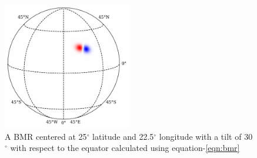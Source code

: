 \begin{figure}
    \centering
    \includegraphics[width=0.5\textwidth]{assets/example_bmr.png}
    \caption{A BMR centered at 25$^{\circ}$ latitude and 22.5$^{\circ}$ longitude with a tilt of 30$^{\circ}$ with respect to the equator calculated using equation-\ref{eqn:bmr}}
    \label{fig:example-bmr}
\end{figure}
